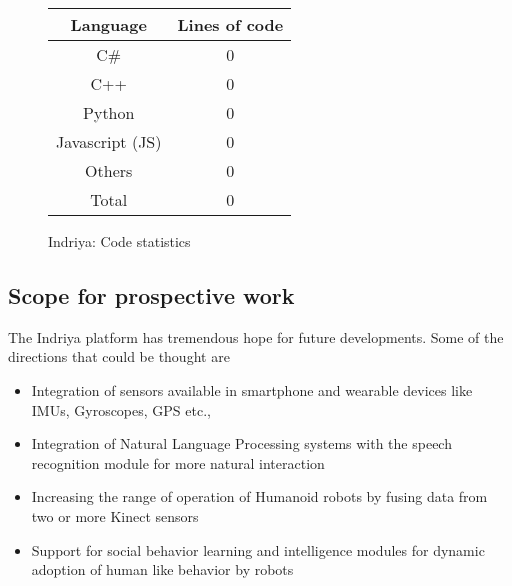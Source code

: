 \begin{figure}[!ht]
  \qquad
  \begin{tabular}[b]{cc}\hline
    Language & Lines of code \\ \hline
    C\# & 0 \\
    C++ & 0 \\
    Python & 0 \\
    Javascript (JS) & 0 \\
    Others & 0 \\
    Total & 0 \\ \hline
  \end{tabular}
  \caption{Indriya: Code statistics}
\end{figure}

\subsection{Scope for prospective work}
  The Indriya platform has tremendous hope for future developments. Some of the directions that could be thought are

\begin{itemize}
\item Integration of sensors available in smartphone and wearable devices like IMUs, Gyroscopes, GPS etc.,
\item Integration of Natural Language Processing systems with the speech recognition module for more natural interaction
\item Increasing the range of operation of Humanoid robots by fusing data from two or more Kinect sensors 
\item Support for social behavior learning and intelligence modules for dynamic adoption of human like behavior by robots
\end{itemize}

